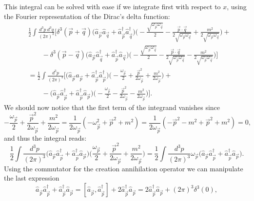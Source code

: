 This integral can be solved with ease if we integrate first with respect to $x$, using the Fourier representation of the Dirac's delta function:
\begin{align*}
    &\frac{1}{2}\int\frac{d^3p\ d^3q}{(2\pi)^3}\bigg[\delta^3(\vec p+\vec q)\big(\hat{a}_{\vec{p}}\hat{a}_{\vec{q}}+\hat{a}_{\vec{p}}^\dagger\hat{a}_{\vec{q}}^\dagger\big)\bigg(-\frac{\sqrt{\omega_{\vec{p}}\omega_{\vec{q}}}}{2}-\frac{\vec p\cdot\vec q}{2\sqrt{\omega_{\vec p}\omega_{\vec q}}}+\frac{m^2}{2\sqrt{\omega_{\vec p}\omega_{\vec q}}}\bigg)+\\ &\qquad-\delta^3(\vec p-\vec q)\big(\hat{a}_{\vec{p}}\hat{a}^\dagger_{\vec{q}}+\hat{a}^\dagger_{\vec{p}}\hat{a}_{\vec{q}}\big)\bigg(-\frac{\sqrt{\omega_{\vec{p}}\omega_{\vec{q}}}}{2}-\frac{\vec p\cdot\vec q}{2\sqrt{\omega_{\vec p}\omega_{\vec q}}}-\frac{m^2}{2\sqrt{\omega_{\vec p}\omega_{\vec q}}}\bigg)\bigg]\\
    &=\frac{1}{2}\int\frac{d^3p}{(2\pi)^3}\bigg[\big(\hat{a}_{\vec{p}}\hat{a}_{\vec{p}}+\hat{a}_{\vec{p}}^\dagger\hat{a}_{\vec{p}}^\dagger\big)\bigg(-\frac{\omega_{\vec{p}}}{2}+\frac{\vec p^2}{2\omega_{\vec p}}+\frac{m^2}{2\omega_{\vec p}}\bigg)+\\&\qquad -\big(\hat{a}_{\vec{p}}\hat{a}^\dagger_{\vec{p}}+\hat{a}^\dagger_{\vec{p}}\hat{a}_{\vec{p}}\big)\bigg(-\frac{\omega_{\vec{p}}}{2}-\frac{\vec p^2}{2\omega_{\vec p}}-\frac{m^2}{2\omega_{\vec p}}\bigg)\bigg].
\end{align*} 
We should now notice that the first term of the integrand vanishes since
\begin{equation*}
    -\frac{\omega_{\vec{p}}}{2}+\frac{\vec p^2}{2\omega_{\vec p}}+\frac{m^2}{2\omega_{\vec p}}=\frac{1}{2\omega_{\vec p}}(-\omega_{\vec{p}}^2+\vec{p}^2+m^2)=\frac{1}{2\omega_{\vec p}}(-\vec{p}^2-m^2+\vec{p}^2+m^2)=0,
\end{equation*}
and thus the integral reads:
\begin{equation*}
    \frac{1}{2}\int\frac{d^3p}{(2\pi)^3}\big(\hat{a}_{\vec{p}}\hat{a}^\dagger_{\vec{p}}+\hat{a}^\dagger_{\vec{p}}\hat{a}_{\vec{p}}\big)\bigg(\frac{\omega_{\vec{p}}}{2}+\frac{\vec p^2}{2\omega_{\vec p}}+\frac{m^2}{2\omega_{\vec p}}\bigg)=\frac{1}{2}\int\frac{d^3p}{(2\pi)^3}\omega_{\vec{p}}\big(\hat{a}_{\vec{p}}\hat{a}^\dagger_{\vec{p}}+\hat{a}^\dagger_{\vec{p}}\hat{a}_{\vec{p}}\big).
\end{equation*}
Using the commutator  for the creation annihilation operator we can manipulate the last expression
\begin{equation*}
    \hat{a}_{\vec{p}}\hat{a}^\dagger_{\vec{p}}+\hat{a}^\dagger_{\vec{p}}\hat{a}_{\vec{p}}=[\hat{a}_{\vec{p}},\hat{a}^\dagger_{\vec{p}}]+2\hat{a}^\dagger_{\vec{p}}\hat{a}_{\vec{p}}=2\hat{a}^\dagger_{\vec{p}}\hat{a}_{\vec{p}}+(2\pi)^3\delta^3(0),
\end{equation*}
